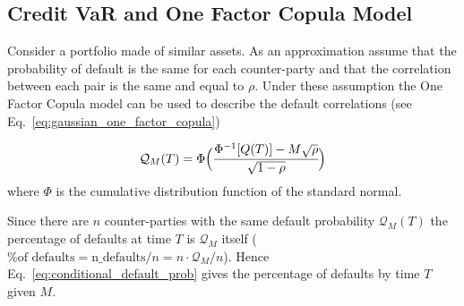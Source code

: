 %
%
%
%  
%

\subsection{Credit VaR and One Factor Copula Model}
Consider a portfolio made of similar assets. As an approximation assume that the probability of default is the same for each counter-party and that the correlation between each pair is the same and equal to $\rho$. Under these assumption the One Factor Copula model can be used to describe the default correlations (see Eq.~\ref{eq:gaussian_one_factor_copula})

\begin{equation}
\mathcal{Q}_M(T) = \Phi\Big(\cfrac{\Phi^{-1}[Q(T)]-M\sqrt{\rho}}{\sqrt{1-\rho}}\Big)
\label{eq:conditional_default_prob}
\end{equation}
where $\Phi$ is the cumulative distribution function of the standard normal.

Since there are $n$ counter-parties with the same default probability $\mathcal{Q}_M(T)$ the percentage of defaults at time $T$ is $\mathcal{Q}_M$ itself ($\textrm{\% of defaults} = \textrm{n\_defaults}/n = n\cdot \mathcal{Q}_M/n$). Hence Eq.~\ref{eq:conditional_default_prob} gives the percentage of defaults by time $T$ given $M$. 

